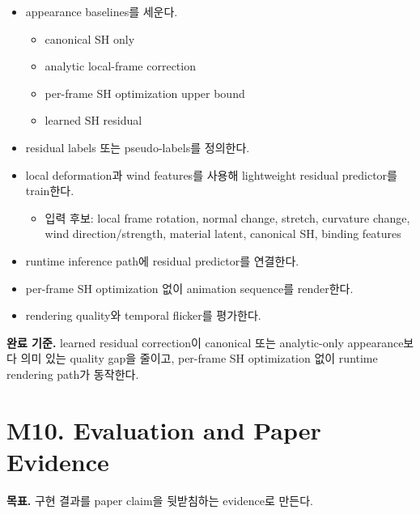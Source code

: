 \documentclass[10pt]{article}
\begin{document}
\begin{itemize}
  \item appearance baselines를 세운다.
    \begin{itemize}
      \item canonical SH only
      \item analytic local-frame correction
      \item per-frame SH optimization upper bound
      \item learned SH residual
    \end{itemize}
  \item residual labels 또는 pseudo-labels를 정의한다.
  \item local deformation과 wind features를 사용해 lightweight residual predictor를 train한다.
    \begin{itemize}
      \item 입력 후보: local frame rotation, normal change, stretch, curvature change, wind direction/strength, material latent, canonical SH, binding features
    \end{itemize}
  \item runtime inference path에 residual predictor를 연결한다.
  \item per-frame SH optimization 없이 animation sequence를 render한다.
  \item rendering quality와 temporal flicker를 평가한다.
\end{itemize}

\textbf{완료 기준.} learned residual correction이 canonical 또는 analytic-only appearance보다 의미 있는 quality gap을 줄이고, per-frame SH optimization 없이 runtime rendering path가 동작한다.

\section{M10. Evaluation and Paper Evidence}

\textbf{목표.} 구현 결과를 paper claim을 뒷받침하는 evidence로 만든다.
\end{document}
